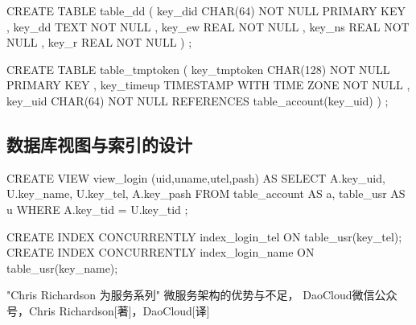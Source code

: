 \begin{sql}[caption=创建可代收表 table\_dd]
    CREATE TABLE table_dd
        ( key_did CHAR(64) NOT NULL PRIMARY KEY
        , key_dd TEXT NOT NULL
        , key_ew REAL NOT NULL
        , key_ns REAL NOT NULL
        , key_r REAL NOT NULL
        )
    ;
\end{sql}

\begin{sql}[caption=创建用户临时Token表 table\_tmptoken]
    CREATE TABLE table_tmptoken
        ( key_tmptoken CHAR(128) NOT NULL PRIMARY KEY
        , key_timeup TIMESTAMP WITH TIME ZONE NOT NULL
        , key_uid CHAR(64) NOT NULL REFERENCES table_account(key_uid)
        )
    ;
\end{sql}
\subsection{数据库视图与索引的设计}
\begin{sql}[caption=创建登陆视图 view\_login]
	CREATE VIEW view_login (uid,uname,utel,pash) AS
		SELECT A.key_uid, U.key_name, U.key_tel, A.key_pash
		FROM table_account AS a, table_usr AS u
		WHERE A.key_tid = U.key_tid
	;
\end{sql}
\begin{sql}[caption=创建登陆用的索引]
	CREATE INDEX CONCURRENTLY index_login_tel ON table_usr(key_tel);
	CREATE INDEX CONCURRENTLY index_login_name ON table_usr(key_name);
\end{sql}
\begin{sql}[caption=创建]
\end{sql}

 \begin{thebibliography}{}
      "Chris Richardson 为服务系列" 微服务架构的优势与不足， DaoCloud微信公众号，Chris Richardson[著]，DaoCloud[译]
 \end{thebibliography}

